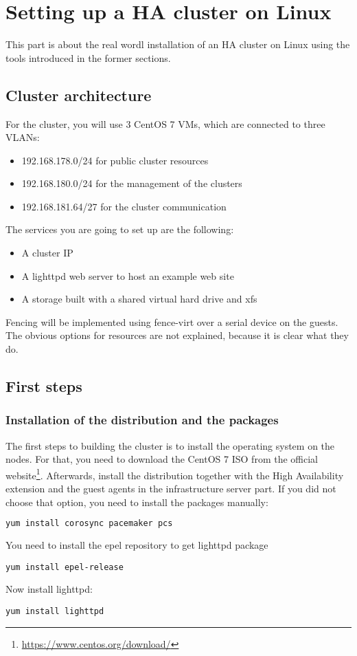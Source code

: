 \section{Setting up a HA cluster on Linux}
This part is about the real wordl installation of an \ac{HA} cluster on Linux using the tools introduced in the former sections.

\subsection{Cluster architecture}
For the cluster, you will use 3 CentOS 7 \acp{VM}, which are connected
to three \acp{VLAN}: 
\begin{itemize}
\item 192.168.178.0/24 for public cluster resources
\item 192.168.180.0/24 for the management of the clusters
\item 192.168.181.64/27 for the cluster communication
\end{itemize}
The services you are going to set up are the following:
\begin{itemize}
\item A cluster IP
\item A lighttpd web server to host an example web site
\item A storage built with a shared virtual hard drive and xfs
\end{itemize}

Fencing will be implemented using fence-virt over a serial device
on the guests.
The obvious options for resources are not explained, because it is clear what they
do.
\subsection{First steps}

\subsubsection{Installation of the distribution and the packages}
The first steps to building the cluster is to install the operating system on the nodes.
For that, you need to download the CentOS 7 ISO from the official website\footnote{\url{https://www.centos.org/download/}}.
Afterwards, install the distribution together with the High Availability extension
and the guest agents in the infrastructure server part.
If you did not choose that option, you need to install the packages manually:
\begin{lstlisting}[language=sh]
yum install corosync pacemaker pcs
\end{lstlisting}
You need to install the \ac{epel} repository to get lighttpd package
\begin{lstlisting}
yum install epel-release
\end{lstlisting}
Now install lighttpd:
\begin{lstlisting}
yum install lighttpd
\end{lstlisting}
